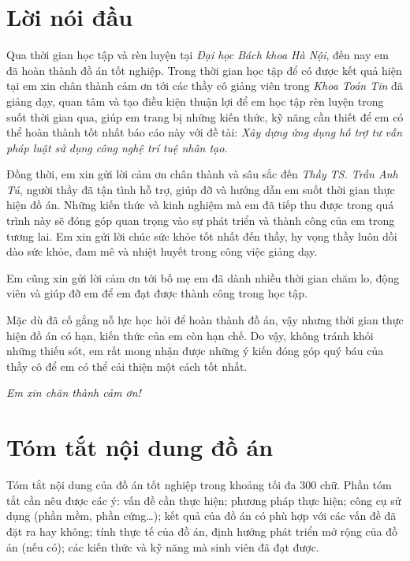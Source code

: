 {\centering \section*{Lời nói đầu}}


Qua thời gian học tập và rèn luyện tại    \textit{Đại học Bách khoa Hà Nội},
đến nay em đã hoàn thành đồ án tốt nghiệp.
Trong thời gian học tập để có được kết quả hiện tại
em xin chân thành cảm ơn tới các thầy cô giảng viên trong \textit{Khoa Toán Tin}
đã giảng dạy, quan tâm và tạo điều kiện thuận lợi để em học tập rèn luyện trong suốt thời gian qua,
giúp em trang bị những kiến thức, kỹ năng cần thiết
để em có thể hoàn thành tốt nhất báo cáo này
với
đề tài:  \textit{Xây dựng ứng dụng hỗ trợ tư vấn pháp luật sử dụng công nghệ trí tuệ nhân tạo}.


Đồng thời, em xin gửi lời cảm ơn chân thành và sâu sắc đến    \textit{Thầy TS. Trần Anh Tú},
người thầy đã tận tình hỗ trợ,
giúp đỡ và hướng dẫn em suốt thời gian thực hiện đồ án.
Những kiến thức và kinh nghiệm mà em đã tiếp thu được trong quá trình này
sẽ đóng góp quan trọng vào sự phát triển và thành công của em trong tương lai.
Em xin gửi lời chúc sức khỏe tốt nhất đến thầy,
hy vọng thầy luôn dồi dào sức khỏe, đam mê và nhiệt huyết trong công việc giảng dạy.


Em cũng xin gửi lời cảm ơn tới bố mẹ em
đã dành nhiều thời gian chăm lo, động viên
và giúp đỡ em để em đạt được thành công trong học tập.

Mặc dù đã cố gắng nỗ lực học hỏi để hoàn thành đồ án,
vậy nhưng thời gian thực hiện đồ án có hạn,
kiến thức của em còn hạn chế.
Do vậy,
không tránh khỏi những thiếu sót,
em rất mong nhận được những ý kiến đóng góp quý báu của thầy cô
để em có thể cải thiện một cách tốt nhất.


\vspace{0.5cm} \emph{Em xin chân thành cảm ơn!}



{\centering \section*{Tóm tắt nội dung đồ án}}


{
\color{RedHUST}


    Tóm tắt nội dung của đồ án tốt nghiệp trong khoảng tối đa 300 chữ.
    Phần tóm tắt cần nêu được các ý:
    vấn đề cần thực hiện;
    phương pháp thực hiện;
    công cụ sử dụng (phần mềm, phần cứng…);
    kết quả của đồ án có phù hợp với các vấn đề đã đặt ra hay không;
    tính thực tế của đồ án,
    định hướng phát triển mở rộng của đồ án (nếu có);
    các kiến thức và kỹ năng mà sinh viên đã đạt được.


    }


